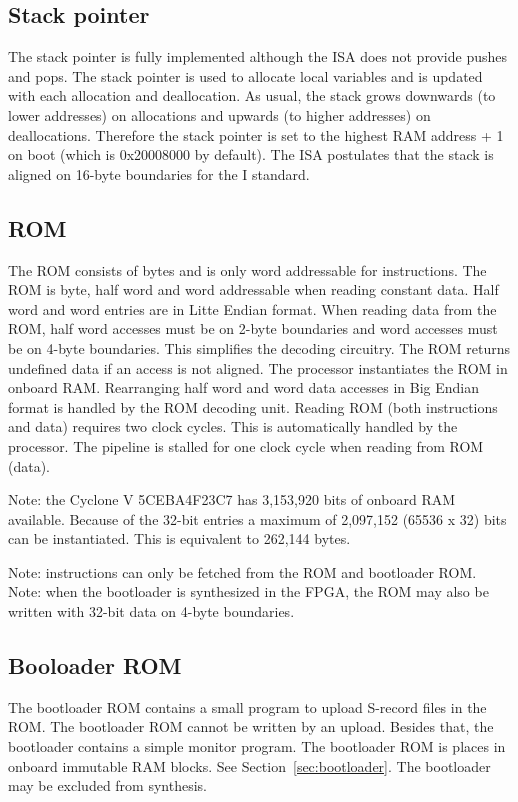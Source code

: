 \documentclass[12pt]{article}
\begin{document}
\subsection{Stack pointer}
The stack pointer is fully implemented although the ISA does not provide pushes and pops. The stack pointer is used to allocate local variables and is updated with each allocation and deallocation. As usual, the stack grows downwards (to lower addresses) on allocations and upwards (to higher addresses) on deallocations. Therefore the stack pointer is set to the highest RAM address + 1 on boot (which is 0x20008000 by default). The ISA postulates that the stack is aligned on 16-byte boundaries for the I standard.

\subsection{ROM}
\label{sec:rom}
The ROM consists of bytes and is only word addressable for instructions. The ROM is byte, half word and word addressable when reading constant data. Half word and word entries are in Litte Endian format. When reading data from the ROM, half word accesses must be on 2-byte boundaries and word accesses must be on 4-byte boundaries. This simplifies the decoding circuitry. The ROM returns undefined data if an access is not aligned. The processor instantiates the ROM in onboard RAM. Rearranging half word and word data accesses in Big Endian format is handled by the ROM decoding unit. Reading ROM (both instructions and data) requires two clock cycles.  This is automatically handled by the processor. The pipeline is stalled for one clock cycle when reading from ROM (data).

Note: the Cyclone V 5CEBA4F23C7 has 3,153,920 bits of onboard RAM available. Because of the 32-bit entries a maximum of 2,097,152 (65536 x 32) bits can be instantiated. This is equivalent to 262,144 bytes.

Note: instructions can only be fetched from the ROM and bootloader ROM. Note: when the bootloader is synthesized in the FPGA, the ROM may also be written with 32-bit data on 4-byte boundaries.

\subsection{Booloader ROM}
\label{sec:bootloaderrom}
The bootloader ROM contains a small program to upload S-record files in the ROM. The bootloader ROM cannot be written by an upload. Besides that, the bootloader contains a simple monitor program. The bootloader ROM is places in onboard immutable RAM blocks. See Section~\ref{sec:bootloader}. The bootloader may be excluded from synthesis.
\end{document}
